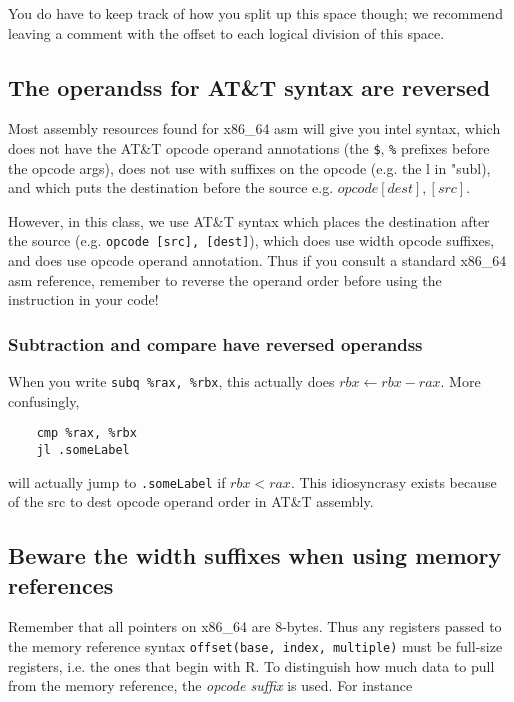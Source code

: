\documentclass[11pt]{article}
\begin{document}
You do have to keep track of how you split up this space though; we recommend leaving a
comment with the offset to each logical division of this space.

\subsection{The operandss for AT\&T syntax are reversed}

Most assembly resources found for x86\_64 asm will give you intel syntax, which does not
have the AT\&T opcode operand annotations (the \texttt{\$}, \texttt{\%} prefixes before the
opcode args), does not use with suffixes on the opcode (e.g. the l in "subl),
and which puts the destination before the source e.g. $opcode [dest], [src]$.

However, in this class, we use AT\&T syntax which places the destination after the source
(e.g. \texttt{opcode [src], [dest]}), which does use width opcode suffixes, and does use opcode
operand annotation. Thus if you consult a standard x86\_64 asm reference, remember to
reverse the operand order before using the instruction in your code!

\subsubsection{Subtraction and compare have reversed operandss}

When you write \texttt{subq \%rax, \%rbx}, this actually does $rbx \leftarrow rbx - rax$. More
confusingly,

\begin{lstlisting}
    cmp %rax, %rbx
    jl .someLabel
\end{lstlisting}

will actually jump to \texttt{.someLabel} if $rbx < rax$. This idiosyncrasy exists because
of the src to dest opcode operand order in AT\&T assembly.

\subsection{Beware the width suffixes when using memory references}

Remember that all pointers on x86\_64 are 8-bytes. Thus any registers passed to the memory
reference syntax \texttt{offset(base, index, multiple)} must be full-size registers, i.e.
the ones that begin with R. To distinguish how much data to pull from the memory
reference, the \emph{opcode suffix} is used. For instance
\end{document}
